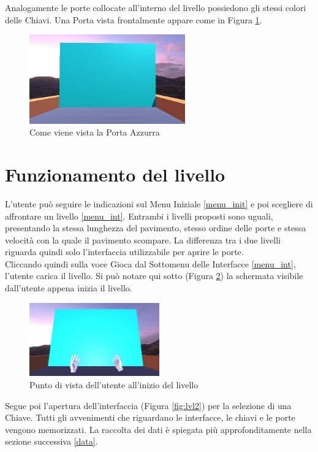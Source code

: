 \documentclass[target=bach,aauheader=]{thud}
\begin{document}
Analogamente le porte collocate all'interno del livello possiedono gli stessi colori delle Chiavi.
Una Porta vista frontalmente appare come in Figura \ref{fig:door}.

\begin{figure}[h]
    \centering
    \includegraphics[width=0.60\textwidth]{door}
    \caption{Come viene vista la Porta Azzurra}
    \label{fig:door}
\end{figure}

\section{Funzionamento del livello}
L'utente può seguire le indicazioni sul Menu Iniziale \ref{menu_init} e poi scegliere di affrontare un livello \ref{menu_int}.
Entrambi i livelli proposti sono uguali, presentando la stessa lunghezza del pavimento, stesso ordine delle porte e stessa velocità con la quale il pavimento scompare.
La differenza tra i due livelli riguarda quindi solo l'interfaccia utilizzabile per aprire le porte. \\

Cliccando quindi sulla voce Gioca dal Sottomenu delle Interfacce \ref{menu_int}, l'utente carica il livello.
Si può notare qui sotto (Figura \ref{fig:lvl1}) la schermata visibile dall'utente appena inizia il livello.

\begin{figure}[h]
    \centering
    \includegraphics[width=0.50\textwidth]{lvl1}
    \caption{Punto di vista dell'utente all'inizio del livello}
    \label{fig:lvl1}
\end{figure}

\newpage
Segue poi l'apertura dell'interfaccia (Figura \ref{fig:lvl2}) per la selezione di una Chiave.
Tutti gli avvenimenti che riguardano le interfacce, le chiavi e le porte vengono memorizzati.
La raccolta dei dati è spiegata più approfonditamente nella sezione successiva \ref{data}. \\
\end{document}
